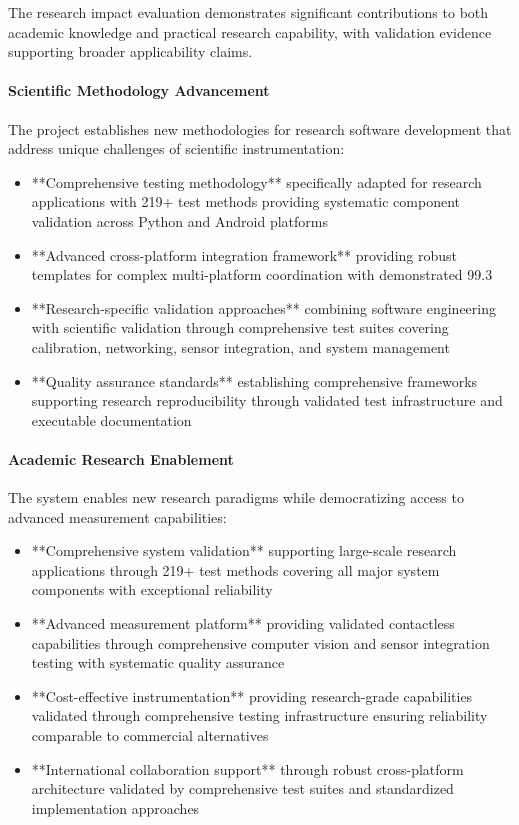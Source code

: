 \documentclass[11pt,a4paper]{article}
\begin{document}
The research impact evaluation demonstrates significant contributions to both academic knowledge and practical research
capability, with validation evidence supporting broader applicability claims.

\paragraph{Scientific Methodology Advancement}

The project establishes new methodologies for research software development that address unique challenges of scientific
instrumentation:

\begin{itemize}
\item **Comprehensive testing methodology** specifically adapted for research applications with 219+ test methods
  providing systematic component validation across Python and Android platforms
\item **Advanced cross-platform integration framework** providing robust templates for complex multi-platform
  coordination with demonstrated 99.3%
\item **Research-specific validation approaches** combining software engineering with scientific validation through
  comprehensive test suites covering calibration, networking, sensor integration, and system management
\item **Quality assurance standards** establishing comprehensive frameworks supporting research reproducibility through
  validated test infrastructure and executable documentation

\end{itemize}
\paragraph{Academic Research Enablement}

The system enables new research paradigms while democratizing access to advanced measurement capabilities:

\begin{itemize}
\item **Comprehensive system validation** supporting large-scale research applications through 219+ test methods
  covering all major system components with exceptional reliability
\item **Advanced measurement platform** providing validated contactless capabilities through comprehensive computer
  vision and sensor integration testing with systematic quality assurance
\item **Cost-effective instrumentation** providing research-grade capabilities validated through comprehensive testing
  infrastructure ensuring reliability comparable to commercial alternatives
\item **International collaboration support** through robust cross-platform architecture validated by comprehensive
  test suites and standardized implementation approaches

\end{itemize}
\end{document}
